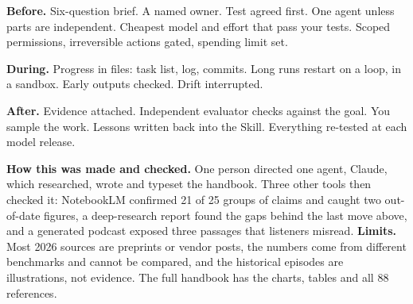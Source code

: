 \documentclass[11pt,letterpaper]{article}
\newcommand{\boxlabel}[1]{{\sffamily\footnotesize\bfseries\color{ink2} #1}}
\begin{document}
\vspace{0.3em}
\noindent\boxlabel{CHECKLIST}\par
\vspace{0.1em}
{\small
\noindent\begin{minipage}[t]{0.32\textwidth}\raggedright
\textbf{Before.} Six-question brief. A named owner. Test agreed first. One agent unless parts
are independent. Cheapest model and effort that pass your tests. Scoped permissions,
irreversible actions gated, spending limit set.
\end{minipage}\hfill
\begin{minipage}[t]{0.32\textwidth}\raggedright
\textbf{During.} Progress in files: task list, log, commits. Long runs restart on a loop, in a
sandbox. Early outputs checked. Drift interrupted.
\end{minipage}\hfill
\begin{minipage}[t]{0.32\textwidth}\raggedright
\textbf{After.} Evidence attached. Independent evaluator checks against the goal. You sample
the work. Lessons written back into the Skill. Everything re-tested at each model release.
\end{minipage}}

\vspace{0.5em}
{\small\color{ink2}\textbf{How this was made and checked.} One person directed one agent, Claude,
which researched, wrote and typeset the handbook. Three other tools then checked it: NotebookLM
confirmed 21 of 25 groups of claims and caught two out-of-date figures, a deep-research report
found the gaps behind the last move above, and a generated podcast exposed three passages that
listeners misread. \textbf{Limits.} Most 2026 sources are preprints or vendor posts, the numbers
come from different benchmarks and cannot be compared, and the historical episodes are
illustrations, not evidence. The full handbook has the charts, tables and all 88 references.\par}
\end{document}
